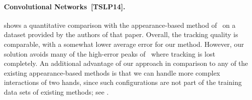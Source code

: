\paragraph*{Convolutional Networks~[TSLP14].}
 shows a quantitative comparison with the appearance-based method of~\cite{tompson_tog14} on a dataset provided by the authors of that paper. Overall, the tracking quality is comparable, with a somewhat lower average error for our method. However, our solution avoids many of the high-error peaks of~\cite{tompson_tog14} where tracking is lost completely.
%
An additional advantage of our approach in comparison to any of the existing appearance-based methods is that we can handle more complex interactions of two hands, since such configurations are not part of the training data sets of existing methods; see . 








%



